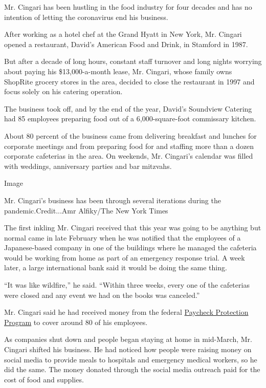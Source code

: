 Mr. Cingari has been hustling in the food industry for four decades and
has no intention of letting the coronavirus end his business.

After working as a hotel chef at the Grand Hyatt in New York, Mr.
Cingari opened a restaurant, David's American Food and Drink, in
Stamford in 1987.

But after a decade of long hours, constant staff turnover and long
nights worrying about paying his \$13,000-a-month lease, Mr. Cingari,
whose family owns ShopRite grocery stores in the area, decided to close
the restaurant in 1997 and focus solely on his catering operation.

The business took off, and by the end of the year, David's Soundview
Catering had 85 employees preparing food out of a 6,000-square-foot
commissary kitchen.

About 80 percent of the business came from delivering breakfast and
lunches for corporate meetings and from preparing food for and staffing
more than a dozen corporate cafeterias in the area. On weekends, Mr.
Cingari's calendar was filled with weddings, anniversary parties and bar
mitzvahs.

Image

Mr. Cingari's business has been through several iterations during the
pandemic.Credit...Amr Alfiky/The New York Times

The first inkling Mr. Cingari received that this year was going to be
anything but normal came in late February when he was notified that the
employees of a Japanese-based company in one of the buildings where he
managed the cafeteria would be working from home as part of an emergency
response trial. A week later, a large international bank said it would
be doing the same thing.

``It was like wildfire,'' he said. ``Within three weeks, every one of
the cafeterias were closed and any event we had on the books was
canceled.''

Mr. Cingari said he had received money from the federal
\href{https://www.nytimes.com/article/small-business-loans-stimulus-grants-freelancers-coronavirus.html}{Paycheck
Protection Program} to cover around 80 of his employees.

As companies shut down and people began staying at home in mid-March,
Mr. Cingari shifted his business. He had noticed how people were raising
money on social media to provide meals to hospitals and emergency
medical workers, so he did the same. The money donated through the
social media outreach paid for the cost of food and supplies.

